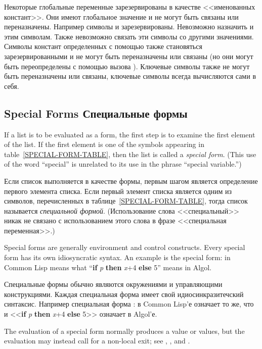 Некоторые глобальные переменные зарезервированы в качестве <<именованных
констант>>.
Они имеют глобальное значение и не могут быть связаны или переназначены.
Например символы {\true} и {\false} зарезервированы.
Невозможно назначить и этим символам. Также невозможно связать эти символы со
другими значениями. Символы констант определенных с помощью 
также становяться зарезервированными и не могут быть переназначены или связаны
(но они могут быть переопределены с помощью вызова ). Ключевые
символы также не могут быть переназначены или связаны, ключевые символы всегда
вычисляются сами в себя.

\subsection{Special Forms Специальные формы}

If a list is to be evaluated as a form, the first step is to examine
the first element of the list.  If the first element is one of
the symbols appearing in table~\ref{SPECIAL-FORM-TABLE},
then the list is called a \textit{special form}.  (This use of the word
``special'' is unrelated to its use in the phrase ``special variable.'')

Если список выполняется в качестве формы, первым шагом является определение
первого элемента списка. Если первый элемент списка является одним из символов,
перечисленных в таблице~\ref{SPECIAL-FORM-TABLE}, тогда список называется
\textit{специальной формой}. (Использование слова <<специальный>> никак не
связано с использованием этого слова в фразе <<специальная переменная>>.)

Special forms are generally environment and control constructs.
Every special form has its own idiosyncratic syntax.  An example
is the  special form:
 in Common Lisp means what
``\textbf{if} \textit{p} \textbf{then} \textit{x}+4 \textbf{else} 5'' means in
Algol.

Специальные формы обычно являются окружениями и управляющими конструкциями.
Каждая специальная форма имеет свой идиосинкразитечский синтаксис. Например
специальная форма :
 в Common Lisp'е означает то же, что и
<<\textbf{if} \textit{p} \textbf{then} \textit{x}+4 \textbf{else} 5>> означает в
Algol'е.

The evaluation of a special form normally produces a value or values,
but the evaluation may instead call for a non-local exit; see ,
, and .

